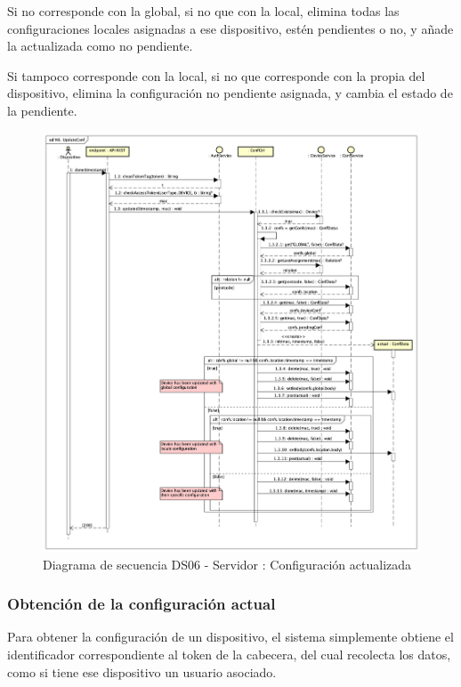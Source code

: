 Si no corresponde con la global, si no que con la local, elimina todas las configuraciones locales asignadas a ese dispositivo, estén pendientes o no, y añade la actualizada como no pendiente.

Si tampoco corresponde con la local, si no que corresponde con la propia del dispositivo, elimina la configuración no pendiente asignada, y cambia el estado de la pendiente.

\begin{figure}[H]
    \centering
    \includegraphics[width=14cm]{./img/sequence/diagram/updateConf.png}
    \caption{Diagrama de secuencia DS06 - Servidor : Configuración actualizada}
    \label{fig:seq.UpdateConf}
\end{figure}

\subsubsection{Obtención de la configuración actual}

Para obtener la configuración de un dispositivo, el sistema simplemente obtiene el identificador correspondiente al token de la cabecera, del cual recolecta los datos, como si tiene ese dispositivo un usuario asociado.

